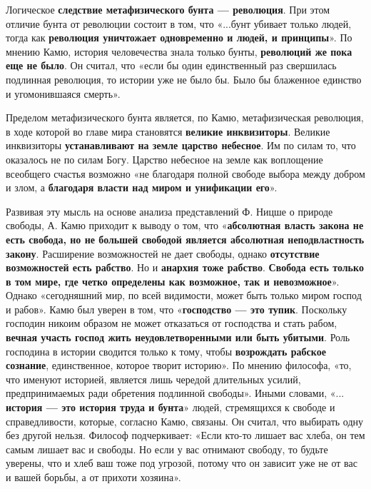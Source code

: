 \documentclass{article}
\begin{document}
\begin{flushleft}
\hfill

Логическое \textbf{следствие метафизического бунта — революция}. При этом отличие бунта от революции состоит в том, что «...бунт убивает только людей, тогда как \textbf{революция уничтожает одновременно и людей, и принципы}». По мнению Камю, история человечества знала только бунты, \textbf{революций же пока еще не было}. Он считал, что «если бы один единственный раз свершилась подлинная революция, то истории уже не было бы. Было бы блаженное единство и угомонившаяся смерть».

\hfill

Пределом метафизического бунта является, по Камю, метафизическая революция, в ходе которой во главе мира становятся \textbf{великие инквизиторы}. Великие инквизиторы \textbf{устанавливают на земле царство небесное}. Им по силам то, что оказалось не по силам Богу. Царство небесное на земле как воплощение всеобщего счастья возможно «не благодаря полной свободе выбора между добром и злом, а \textbf{благодаря власти над миром и унификации его}».

\hfill

Развивая эту мысль на основе анализа представлений Ф. Ницше о природе свободы, А. Камю приходит к выводу о том, что «\textbf{абсолютная власть закона не есть свобода, но не большей свободой является абсолютная неподвластность закону}. Расширение возможностей не дает свободы, однако \textbf{отсутствие возможностей есть рабство}. Но и \textbf{анархия тоже рабство}. \textbf{Свобода есть только в том мире, где четко определены как возможное, так и невозможное}». Однако «сегодняшний мир, по всей видимости, может быть только миром господ и рабов». Камю был уверен в том, что «\textbf{господство — это тупик}. Поскольку господин никоим образом не может отказаться от господства и стать рабом, \textbf{вечная участь господ жить неудовлетворенными или быть убитыми}. Роль господина в истории сводится только к тому, чтобы \textbf{возрождать рабское сознание}, единственное, которое творит историю». По мнению философа, «то, что именуют историей, является лишь чередой длительных усилий, предпринимаемых ради обретения подлинной свободы». Иными словами, «... \textbf{история — это история труда и бунта}» людей, стремящихся к свободе и справедливости, которые, согласно Камю, связаны. Он считал, что выбирать одну без другой нельзя. Философ подчеркивает: «Если кто-то лишает вас хлеба, он тем самым лишает вас и свободы. Но если у вас отнимают свободу, то будьте уверены, что и хлеб ваш тоже под угрозой, потому что он зависит уже не от вас и вашей борьбы, а от прихоти хозяина».


\end{flushleft}
\end{document}
